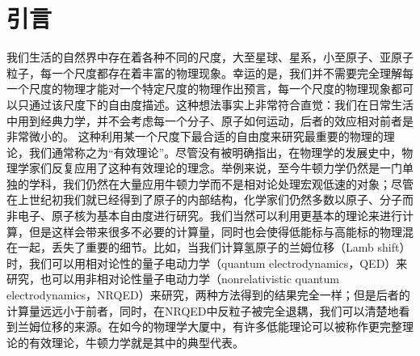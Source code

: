 \chapter{引言}\label{chap:introduction}


我们生活的自然界中存在着各种不同的尺度，大至星球、星系，小至原子、亚原子粒子，每一个尺度都存在着丰富的物理现象。幸运的是，我们并不需要完全理解每一个尺度的物理才能对一个特定尺度的物理作出预言，每一个尺度的物理现象都可以只通过该尺度下的自由度描述。这种想法事实上非常符合直觉：我们在日常生活中用到经典力学，并不会考虑每一个分子、原子如何运动，后者的效应相对前者是非常微小的。
这种利用某一个尺度下最合适的自由度来研究最重要的物理的理论，我们通常称之为“有效理论”\cite{Georgi1993}。尽管没有被明确指出，在物理学的发展史中，物理学家们反复应用了这种有效理论的理念。举例来说，至今牛顿力学仍然是一门单独的学科，我们仍然在大量应用牛顿力学而不是相对论处理宏观低速的对象；尽管在上世纪初我们就已经得到了原子的内部结构，化学家们仍然多数以原子、分子而非电子、原子核为基本自由度进行研究。我们当然可以利用更基本的理论来进行计算，但是这样会带来很多不必要的计算量，同时也会使得低能标与高能标的物理混在一起，丢失了重要的细节。比如，当我们计算氢原子的兰姆位移（Lamb shift）时，我们可以用相对论性的量子电动力学（quantum electrodynamics，QED）来研究\cite{Weinberg2005}，也可以用非相对论性量子电动力学（nonrelativistic quantum electrodynamics，NRQED）来研究\cite{Pineda1998}，两种方法得到的结果完全一样；但是后者的计算量远远小于前者，同时，在NRQED中反粒子被完全退耦，我们可以清楚地看到兰姆位移的来源。在如今的物理学大厦中，有许多低能理论可以被称作更完整理论的有效理论，牛顿力学就是其中的典型代表。%


